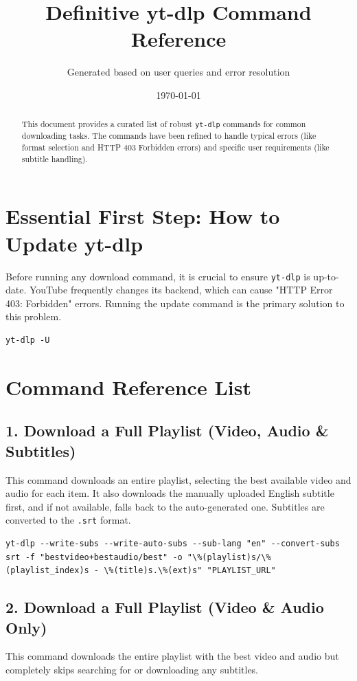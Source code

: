 \documentclass[a4paper, 11pt]{article}
\title{Definitive yt-dlp Command Reference}
\author{Generated based on user queries and error resolution}
\date{\today}
\begin{document}
\maketitle

\begin{abstract}
This document provides a curated list of robust \texttt{yt-dlp} commands for common downloading tasks. The commands have been refined to handle typical errors (like format selection and HTTP 403 Forbidden errors) and specific user requirements (like subtitle handling).
\end{abstract}

\tableofcontents
\newpage

\section{Essential First Step: How to Update yt-dlp}
Before running any download command, it is crucial to ensure \texttt{yt-dlp} is up-to-date. YouTube frequently changes its backend, which can cause "HTTP Error 403: Forbidden" errors. Running the update command is the primary solution to this problem.

\begin{lstlisting}[caption={yt-dlp update command}, label={lst:update}]
yt-dlp -U
\end{lstlisting}

\section{Command Reference List}
\subsection{1. Download a Full Playlist (Video, Audio \& Subtitles)}
This command downloads an entire playlist, selecting the best available video and audio for each item. It also downloads the manually uploaded English subtitle first, and if not available, falls back to the auto-generated one. Subtitles are converted to the \texttt{.srt} format.

\begin{lstlisting}[caption={Download full playlist with subtitles}, label={lst:playlist-subs}]
yt-dlp --write-subs --write-auto-subs --sub-lang "en" --convert-subs srt -f "bestvideo+bestaudio/best" -o "\%(playlist)s/\%(playlist_index)s - \%(title)s.\%(ext)s" "PLAYLIST_URL"
\end{lstlisting}

\subsection{2. Download a Full Playlist (Video \& Audio Only)}
This command downloads the entire playlist with the best video and audio but completely skips searching for or downloading any subtitles.
\end{document}
